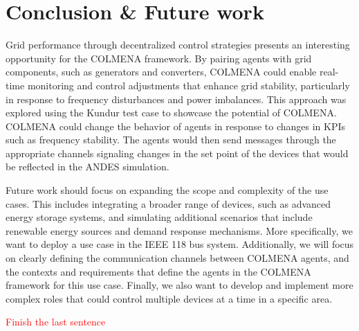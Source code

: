 \documentclass{article}
\begin{document}
\section{Conclusion \& Future work}

Grid performance through decentralized control strategies presents an interesting opportunity for the COLMENA framework. By pairing agents with grid components, such as generators and converters, COLMENA could enable real-time monitoring and control adjustments that enhance grid stability, particularly in response to frequency disturbances and power imbalances. This approach was explored using the Kundur test case to showcase the potential of COLMENA. COLMENA could change the behavior of agents in response to changes in KPIs such as frequency stability. The agents would then send messages through the appropriate channels signaling changes in the set point of the devices that would be reflected in the ANDES simulation.

Future work should focus on expanding the scope and complexity of the use cases. This includes integrating a broader range of devices, such as advanced energy storage systems, and simulating additional scenarios that include renewable energy sources and demand response mechanisms. More specifically, we want to deploy a use case in the IEEE 118 bus system. Additionally, we will focus on clearly defining the communication channels between COLMENA agents, and the contexts  and requirements that define the agents in the COLMENA framework for this use case. Finally, we also want to develop and implement more complex roles that could control multiple devices at a time in a specific area.  

\textcolor{red}{Finish the last sentence}

\end{document}
